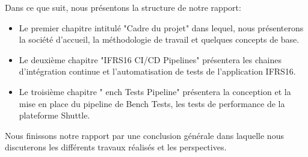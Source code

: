 \begin{spacing}{1.2}
Dans ce que suit, nous présentons la structure de notre rapport:
\begin{itemize}
\setlength\itemsep{0em}
\item Le premier chapitre intitulé "Cadre du projet" dans lequel, nous présenterons la société d’accueil, la méthodologie de travail et quelques concepts de base.
\item Le deuxième chapitre "IFRS16 CI/CD Pipelines" présentera les chaines d'intégration continue et l'automatisation de tests de l'application IFRS16.
\item Le troisième chapitre " ench Tests Pipeline" présentera la conception et la mise en place du pipeline de Bench Tests, les tests de performance de la plateforme Shuttle. 
\end{itemize}

Nous finissons notre rapport par une conclusion générale dans laquelle nous discuterons les différents travaux réalisés et les perspectives.
\end{spacing}
